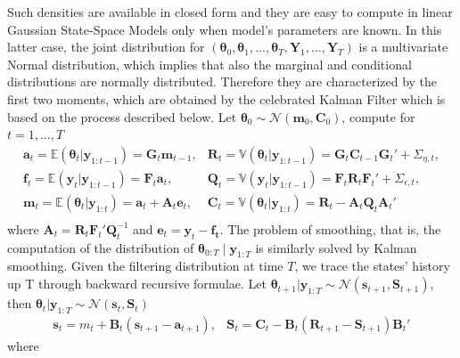 \documentclass[
  12pt,
]{book}
\theoremstyle{break}
\theoremstyle{nonumberplain}
\begin{document}
Such densities are available in closed form and they are easy to compute
in linear Gaussian State-Space Models only when model's parameters are
known. In this latter case, the joint distribution for
\((\boldsymbol{\theta}_{0},\boldsymbol{\theta}_{1},...,\boldsymbol{\theta}_{T},\boldsymbol{Y}_{1},...,\boldsymbol{Y}_{T})\)
is a multivariate Normal distribution, which implies that also the
marginal and conditional distributions are normally distributed.
Therefore they are characterized by the first two moments, which are
obtained by the celebrated Kalman Filter which is based on the process
described below. Let
\(\boldsymbol{\theta}_{0}\sim \mathcal{N}(\boldsymbol{m}_{0},\boldsymbol{C}_{0})\),
compute for \(t=1,...,T\) \begin{equation}\label{eq:Kalman}
\begin{matrix}
\boldsymbol{a}_{t}=\mathbb E(\boldsymbol{\theta}_{t}|\boldsymbol{y}_{1:t-1})=\boldsymbol{G}_{t}\boldsymbol{m}_{t-1}, & \boldsymbol{R}_{t}=\mathbb V(\boldsymbol{\theta}_{t}|\boldsymbol{y}_{1:t-1})=\boldsymbol{G}_{t}\boldsymbol{C}_{t-1}\boldsymbol{G}_{t}'+\Sigma_{\eta,t}, \\
\boldsymbol{f}_{t}=\mathbb E(\boldsymbol{y}_{t}|\boldsymbol{y}_{1:t-1})=\boldsymbol{F}_{t}\boldsymbol{a}_{t}, & \boldsymbol{Q}_{t}=\mathbb V(\boldsymbol{y}_{t}|\boldsymbol{y}_{1:t-1})=\boldsymbol{F}_{t}\boldsymbol{R}_{t}\boldsymbol{F}_{t}'+\Sigma_{\epsilon,t}, \\
\boldsymbol{m}_{t}=\mathbb E(\boldsymbol{\theta}_{t}|\boldsymbol{y}_{1:t})=\boldsymbol{a}_{t}+\boldsymbol{A}_{t}\boldsymbol{e}_{t}, & \boldsymbol{C}_{t}=\mathbb V(\boldsymbol{\theta}_{t}|\boldsymbol{y}_{1:t})=\boldsymbol{R}_{t}-\boldsymbol{A}_{t}\boldsymbol{Q}_{t}\boldsymbol{A}_{t}' \\
\end{matrix}
\end{equation} where
\(\boldsymbol{A}_{t}=\boldsymbol{R}_{t}\boldsymbol{F}_{t}'\boldsymbol{Q}_{t}^{-1}\)
and \(\boldsymbol{e}_{t}=\boldsymbol{y}_{t}-\boldsymbol{f_t}\). The
problem of smoothing, that is, the computation of the distribution of
\(\boldsymbol{\theta}_{0:T} \mid \boldsymbol{y}_{1:T}\) is similarly
solved by Kalman smoothing. Given the filtering distribution at time
\(T\), we trace the states' history up T through backward recursive
formulae. Let
\(\boldsymbol{\theta}_{t+1}|\boldsymbol{y}_{1:T}\sim\mathcal{N}(\boldsymbol{s}_{t+1},\boldsymbol{S}_{t+1})\),
then
\(\boldsymbol{\theta}_{t}|\boldsymbol{y}_{1:T}\sim\mathcal{N}(\boldsymbol{s}_{t},\boldsymbol{S}_{t})\)
\begin{equation}\label{eq:Smooth}
\begin{matrix}
\boldsymbol{s}_{t}={m}_{t}+\boldsymbol{B}_{t}(\boldsymbol{s}_{t+1}-\boldsymbol{a}_{t+1}), & \boldsymbol{S}_{t}=\boldsymbol{C}_{t}-\boldsymbol{B}_{t}(\boldsymbol{R}_{t+1}-\boldsymbol{S}_{t+1})\boldsymbol{B}_{t}'
\end{matrix}
\end{equation} where
\end{document}
